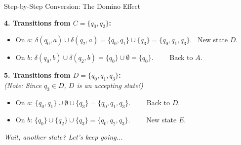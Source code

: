 \documentclass[10pt,aspectratio=169]{beamer}
\begin{document}
\begin{frame}{Step-by-Step Conversion: The Domino Effect}

\textbf{4. Transitions from $C = \{q_0, q_2\}$:}
\begin{itemize}
\item On $a$: $\delta(q_0, a) \cup \delta(q_2, a) = \{q_0, q_1\} \cup \{q_3\} = \{q_0, q_1, q_3\}$. \textrightarrow\ New state $D$.
\item On $b$: $\delta(q_0, b) \cup \delta(q_2, b) = \{q_0\} \cup \emptyset = \{q_0\}$. \quad \quad \quad \quad \ \ \, \textrightarrow\ Back to $A$.
\end{itemize}

\vspace{1em}
\pause

\textbf{5. Transitions from $D = \{q_0, q_1, q_3\}$:} \\
\textit{(Note: Since $q_3 \in D$, $D$ is an accepting state!)}
\begin{itemize}
\item On $a$: $\{q_0, q_1\} \cup \emptyset \cup \{q_3\} = \{q_0, q_1, q_3\}$. \quad \quad \quad \ \ \, \textrightarrow\ Back to $D$.
\item On $b$: $\{q_0\} \cup \{q_2\} \cup \{q_3\} = \{q_0, q_2, q_3\}$. \quad \quad \quad \ \ \, \textrightarrow\ New state $E$.
\end{itemize}

\vspace{1em}
\pause

\textit{Wait, another state? Let's keep going...}

\end{frame}
\end{document}
